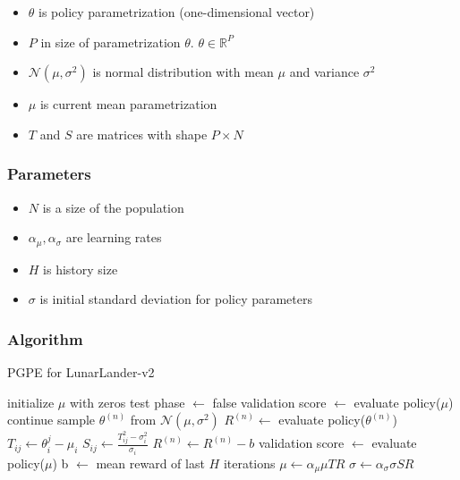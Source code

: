 \documentclass[12pt]{article}
\begin{document}
\begin{itemize}

\item $\theta$ is policy parametrization (one-dimensional vector)

\item $P$ in size of parametrization $\theta$. $\theta \in \mathbb{R}^P$

\item $\mathcal{N}(\mu, \sigma^2)$ is normal distribution with mean $\mu$ and variance $\sigma^2$

\item $\mu$ is current mean parametrization

\item $T$ and $S$ are matrices with shape $P\times N$

\end{itemize}

\subsubsection{Parameters}

\begin{itemize}
\item $N$ is a size of the population
\item $\alpha_\mu, \alpha_\sigma$ are learning rates
\item $H$ is history size
\item $\sigma$ is initial standard deviation for policy parameters

\end{itemize}

\subsubsection{Algorithm}

\begin{algorithm}
\caption{PGPE for LunarLander-v2}
\begin{algorithmic}[1]
\State initialize $\mu$ with zeros
\State test phase $\gets$ false
		\State validation score $\gets$ evaluate policy($\mu$)
		\State continue
	\EndIf
		\State sample $\theta^{(n)}$ from $\mathcal{N}(\mu, \sigma^2)$
	\State $R^{(n)} \gets$ evaluate policy($\theta^{(n)}$)
	\EndFor
	\State $T_{ij} \gets \theta_i^{j} - \mu_i$
	\State $S_{ij} \gets \frac{T_{ij}^2 - \sigma_i^2}{\sigma_i}$
	\State $R^{(n)} \gets R^{(n)} - b$
	\State validation score $\gets$ evaluate policy($\mu$)
	\State b $\gets$ mean reward of last $H$ iterations
	\EndIf
	\State $\mu \gets \alpha_\mu \mu TR$
	\State $\sigma \gets \alpha_\sigma \sigma SR$
\EndWhile

\end{algorithmic}
\end{algorithm}
\end{document}
